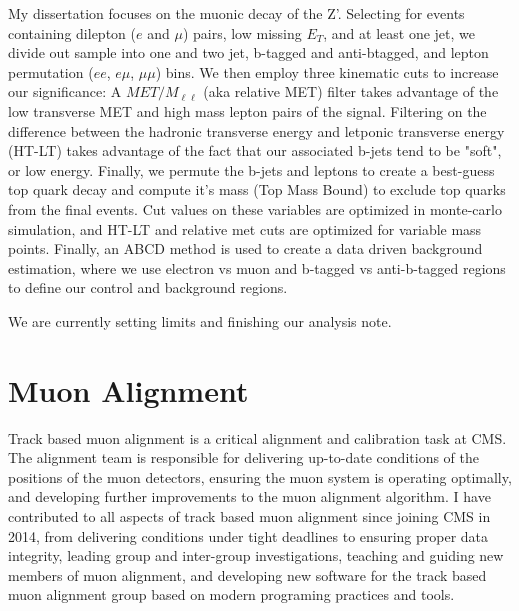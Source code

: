 \documentclass[11pt]{article}
\begin{document}


My dissertation focuses on the muonic decay of the Z'. Selecting for events containing dilepton ($e$ and $\mu$) pairs, low missing $E_T$, and at least one jet, we divide out sample into one and two jet, b-tagged and anti-btagged, and lepton permutation ($ee$, $e\mu$, $\mu\mu$) bins. We then employ three kinematic cuts to increase our significance: A $MET/M_{\ell\ell}$ (aka relative MET) filter takes advantage of the low transverse MET and high mass lepton pairs of the signal. Filtering on the difference between the hadronic transverse energy and letponic transverse energy (HT-LT) takes advantage of the fact that our associated b-jets tend to be "soft", or low energy. Finally, we permute the b-jets and leptons to create a best-guess top quark decay and compute it's mass (Top Mass Bound) to exclude top quarks from the final events. Cut values on these variables are optimized in monte-carlo simulation, and HT-LT and relative met cuts are optimized for variable mass points. Finally, an ABCD method is used to create a data driven background estimation, where we use electron vs muon and b-tagged vs anti-b-tagged regions to define our control and background regions. 

We are currently setting limits and finishing our analysis note. 

\section{Muon Alignment}

 Track based muon alignment is a critical alignment and calibration task at CMS. The alignment team is responsible for delivering up-to-date conditions of the positions of the muon detectors, ensuring the muon system is operating optimally, and developing further improvements to the muon alignment algorithm. I have contributed to all aspects of track based muon alignment since joining CMS in 2014, from delivering conditions under tight deadlines to ensuring proper data integrity, leading group and inter-group investigations, teaching and guiding new members of muon alignment, and developing new software for the track based muon alignment group based on modern programing practices and tools.
 
\end{document}

